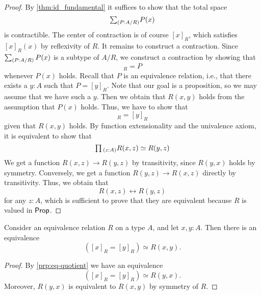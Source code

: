 \begin{proof}
  By \cref{thm:id_fundamental} it suffices to show that the total space
  \begin{equation*}
    \sm{P:A/R}P(x)
  \end{equation*}
  is contractible. The center of contraction is of course $[x]_R$, which satisfies $[x]_R(x)$ by reflexivity of $R$. It remains to construct a contraction. Since $\sm{P:A/R}P(x)$ is a subtype of $A/R$, we construct a contraction by showing that
  \begin{equation*}
    [x]_R=P
  \end{equation*}
  whenever $P(x)$ holds. Recall that $P$ is an equivalence relation, i.e., that there exists a $y:A$ such that $P=[y]_R$. Note that our goal is a proposition, so we may assume that we have such a $y$. Then we obtain that $R(x,y)$ holds from the assumption that $P(x)$ holds. Thus, we have to show that
  \begin{equation*}
    [x]_R=[y]_R
  \end{equation*}
  given that $R(x,y)$ holds. By function extensionality and the univalence axiom, it is equivalent to show that
  \begin{equation*}
    \prd{z:A}R(x,z)\simeq R(y,z)
  \end{equation*}
  We get a function $R(x,z)\to R(y,z)$ by transitivity, since $R(y,x)$ holds by symmetry. Conversely, we get a function $R(y,z)\to R(x,z)$ directly by transitivity. Thus, we obtain that
  \begin{equation*}
    R(x,z)\leftrightarrow R(y,z)
  \end{equation*}
  for any $z:A$, which is sufficient to prove that they are equivalent because $R$ is valued in $\mathsf{Prop}$.
\end{proof}

\begin{cor}
  Consider an equivalence relation $R$ on a type $A$, and let $x,y:A$. Then there is an equivalence
  \begin{equation*}
    ([x]_R=[y]_R)\simeq R(x,y).
  \end{equation*}
\end{cor}

\begin{proof}
  By \cref{prp:eq-quotient} we have an equivalence
  \begin{equation*}
    ([x]_R=[y]_R)\simeq R(y,x).
  \end{equation*}
  Moreover, $R(y,x)$ is equivalent to $R(x,y)$ by symmetry of $R$.
\end{proof}

